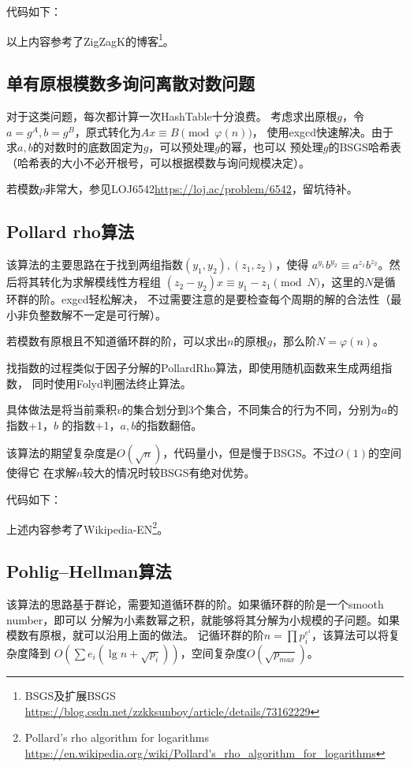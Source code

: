 代码如下：


以上内容参考了ZigZagK的博客\footnote{BSGS及扩展BSGS\\
\url{https://blog.csdn.net/zzkksunboy/article/details/73162229}}。
\subsection{单有原根模数多询问离散对数问题}
对于这类问题，每次都计算一次HashTable十分浪费。
考虑求出原根$g$，令$a=g^A,b=g^B$，原式转化为$Ax\equiv B\pmod{\varphi(n)}$，
使用exgcd快速解决。由于求$a,b$的对数时的底数固定为$g$，可以预处理$g$的幂，也可以
预处理$g$的BSGS哈希表（哈希表的大小不必开根号，可以根据模数与询问规模决定）。

若模数$p$非常大，参见LOJ6542\url{https://loj.ac/problem/6542}，留坑待补。

\subsection{Pollard rho算法}

该算法的主要思路在于找到两组指数$(y_1,y_2),(z_1,z_2)$，使得
$a^{y_1}b^{y_2}\equiv a^{z_1}b^{z_2}$。然后将其转化为求解模线性方程组
$(z_2-y_2)x\equiv y_1-z_1\pmod{N}$，这里的$N$是循环群的阶。exgcd轻松解决，
不过需要注意的是要检查每个周期的解的合法性（最小非负整数解不一定是可行解）。

若模数有原根且不知道循环群的阶，可以求出$n$的原根$g$，那么阶$N=\varphi(n)$。

找指数的过程类似于因子分解的PollardRho算法，即使用随机函数来生成两组指数，
同时使用Folyd判圈法终止算法。

具体做法是将当前乘积$v$的集合划分到3个集合，不同集合的行为不同，分别为$a$的指数+1，$b$
的指数+1，$a,b$的指数翻倍。

该算法的期望复杂度是$O(\sqrt{n})$，代码量小，但是慢于BSGS。不过$O(1)$的空间使得它
在求解$n$较大的情况时较BSGS有绝对优势。

代码如下：


上述内容参考了Wikipedia-EN\footnote{
    Pollard's rho algorithm for logarithms
    \url{https://en.wikipedia.org/wiki/Pollard's\_rho\_algorithm\_for\_logarithms}
}。
\subsection{Pohlig–Hellman算法}\label{PHDL}
该算法的思路基于群论，需要知道循环群的阶。如果循环群的阶是一个smooth number，即可以
分解为小素数幂之积，就能够将其分解为小规模的子问题。如果模数有原根，就可以沿用上面的做法。
记循环群的阶$n=\displaystyle \prod{p_i^{e^i}}$，该算法可以将复杂度降到
$O(\displaystyle \sum{e_i(\lg n+\sqrt{p_i})})$，空间复杂度$O(\sqrt{p_{max}})$。

